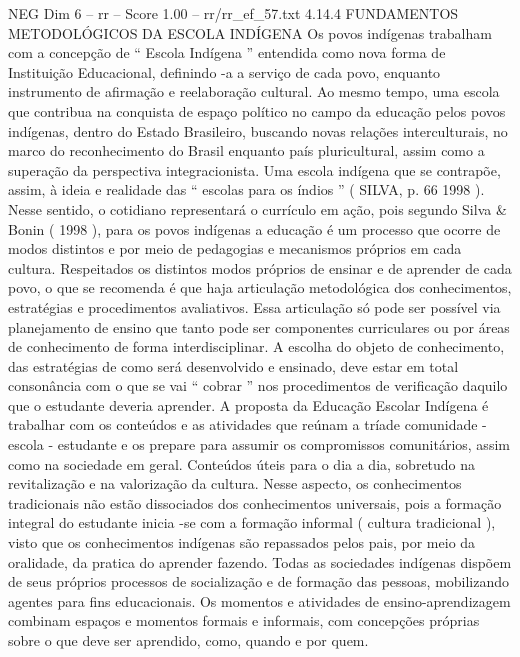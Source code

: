 \begin{textsample}{NEG Dim 6 – rr – Score 1.00 – rr/rr\_ef\_57.txt}  \label{ex:f6_neg_077}
4.14.4 FUNDAMENTOS METODOLÓGICOS DA ESCOLA INDÍGENA Os povos indígenas trabalham com a concepção de “ Escola Indígena ” entendida como nova forma de Instituição Educacional, definindo -a a serviço de cada povo, enquanto instrumento de afirmação e reelaboração cultural.
Ao mesmo tempo, uma escola que contribua na conquista de espaço político no campo da educação pelos povos indígenas, dentro do Estado Brasileiro, buscando novas relações interculturais, no marco do reconhecimento do Brasil enquanto país pluricultural, assim como a superação da perspectiva integracionista.
Uma escola indígena que se contrapõe, assim, à ideia e realidade das “ escolas para os índios ” ( SILVA, p. 66 1998 ).
Nesse sentido, o cotidiano representará o currículo em ação, pois segundo Silva \& Bonin ( 1998 ), para os povos indígenas a educação é um processo que ocorre de modos distintos e por meio de pedagogias e mecanismos próprios em cada cultura.
Respeitados os distintos modos próprios de ensinar e de aprender de cada povo, o que se recomenda é que haja articulação metodológica dos conhecimentos, estratégias e procedimentos avaliativos.
Essa articulação só pode ser possível via planejamento de ensino que tanto pode ser componentes curriculares ou por áreas de conhecimento de forma interdisciplinar.
A escolha do objeto de conhecimento, das estratégias de como será desenvolvido e ensinado, deve estar em total consonância com o que se vai “ cobrar ” nos procedimentos de verificação daquilo que o estudante deveria aprender.
A proposta da Educação Escolar Indígena é trabalhar com os conteúdos e as atividades que reúnam a tríade comunidade - escola - estudante e os prepare para assumir os compromissos comunitários, assim como na sociedade em geral.
Conteúdos úteis para o dia a dia, sobretudo na revitalização e na valorização da cultura.
Nesse aspecto, os conhecimentos tradicionais não estão dissociados dos conhecimentos universais, pois a formação integral do estudante inicia -se com a formação informal ( cultura tradicional ), visto que os conhecimentos indígenas são repassados pelos pais, por meio da oralidade, da pratica do aprender fazendo.
Todas as sociedades indígenas dispõem de seus próprios processos de socialização e de formação das pessoas, mobilizando agentes para fins educacionais.
Os momentos e atividades de ensino-aprendizagem combinam espaços e momentos formais e informais, com concepções próprias sobre o que deve ser aprendido, como, quando e por quem.

\end{textsample}
